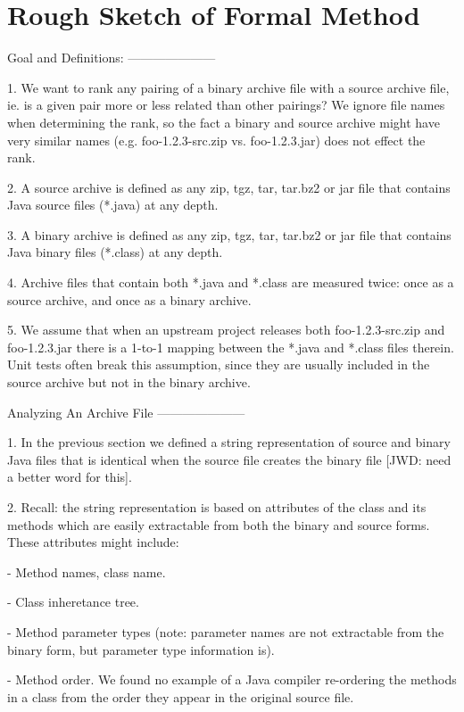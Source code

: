 
\section{Rough Sketch of Formal Method}




Goal and Definitions:
---------------------

1.  We want to rank any pairing of a binary archive file
    with a source archive file, ie. is a given pair more or less related
    than other pairings?  We ignore file names when determining the rank,
    so the fact a binary and source archive might have very similar
    names (e.g. foo-1.2.3-src.zip vs. foo-1.2.3.jar) does not effect the
    rank.
   
2.  A source archive is defined as any zip, tgz, tar, tar.bz2 or jar file
    that contains Java source files (*.java) at any depth.

3.  A binary archive is defined as any zip, tgz, tar, tar.bz2 or jar file
    that contains Java binary files (*.class) at any depth.

4.  Archive files that contain both *.java and *.class are measured twice:
    once as a source archive, and once as a binary archive.

5.  We assume that when an upstream project releases both foo-1.2.3-src.zip
    and foo-1.2.3.jar there is a 1-to-1 mapping between the *.java and *.class
    files therein.  Unit tests often break this assumption, since they are
    usually included in the source archive but not in the binary archive.


Analyzing An Archive File
---------------------

1.  In the previous section we defined a string representation of source
    and binary Java files that is identical when the source file creates
    the binary file [JWD:  need a better word for this].

2.  Recall:  the string representation is based on attributes of the class
    and its methods which are easily extractable from both the binary and
    source forms.  These attributes might include:

      - Method names, class name.

      - Class inheretance tree.

      - Method parameter types
        (note:  parameter names are not extractable from the binary form,
         but parameter type information is).

      - Method order.  We found no example of a Java compiler re-ordering
        the methods in a class from the order they appear in the original
        source file.

